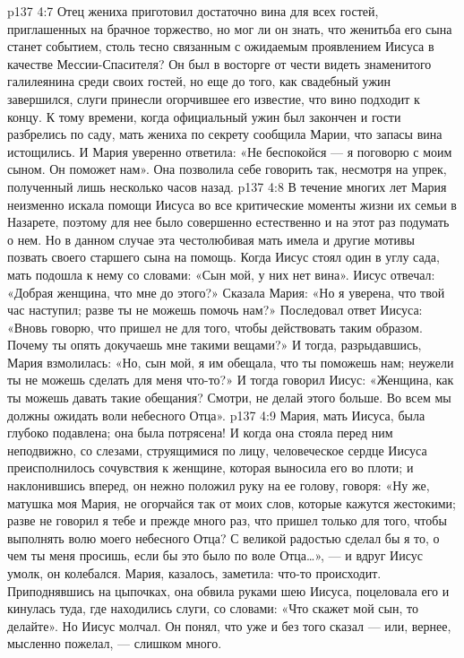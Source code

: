 \vs p137 4:7 \pc Отец жениха приготовил достаточно вина для всех гостей, приглашенных на брачное торжество, но мог ли он знать, что женитьба его сына станет событием, столь тесно связанным с ожидаемым проявлением Иисуса в качестве Мессии\hyp{}Спасителя? Он был в восторге от чести видеть знаменитого галилеянина среди своих гостей, но еще до того, как свадебный ужин завершился, слуги принесли огорчившее его известие, что вино подходит к концу. К тому времени, когда официальный ужин был закончен и гости разбрелись по саду, мать жениха по секрету сообщила Марии, что запасы вина истощились. И Мария уверенно ответила: «Не беспокойся --- я поговорю с моим сыном. Он поможет нам». Она позволила себе говорить так, несмотря на упрек, полученный лишь несколько часов назад.
\vs p137 4:8 В течение многих лет Мария неизменно искала помощи Иисуса во все критические моменты жизни их семьи в Назарете, поэтому для нее было совершенно естественно и на этот раз подумать о нем. Но в данном случае эта честолюбивая мать имела и другие мотивы позвать своего старшего сына на помощь. Когда Иисус стоял один в углу сада, мать подошла к нему со словами: «Сын мой, у них нет вина». Иисус отвечал: «Добрая женщина, что мне до этого?» Сказала Мария: «Но я уверена, что твой час наступил; разве ты не можешь помочь нам?» Последовал ответ Иисуса: «Вновь говорю, что пришел не для того, чтобы действовать таким образом. Почему ты опять докучаешь мне такими вещами?» И тогда, разрыдавшись, Мария взмолилась: «Но, сын мой, я им обещала, что ты поможешь нам; неужели ты не можешь сделать для меня что\hyp{}то?» И тогда говорил Иисус: «Женщина, как ты можешь давать такие обещания? Смотри, не делай этого больше. Во всем мы должны ожидать воли небесного Отца».
\vs p137 4:9 Мария, мать Иисуса, была глубоко подавлена; она была потрясена! И когда она стояла перед ним неподвижно, со слезами, струящимися по лицу, человеческое сердце Иисуса преисполнилось сочувствия к женщине, которая выносила его во плоти; и наклонившись вперед, он нежно положил руку на ее голову, говоря: «Ну же, матушка моя Мария, не огорчайся так от моих слов, которые кажутся жестокими; разве не говорил я тебе и прежде много раз, что пришел только для того, чтобы выполнять волю моего небесного Отца? С великой радостью сделал бы я то, о чем ты меня просишь, если бы это было по воле Отца\ldots », --- и вдруг Иисус умолк, он колебался. Мария, казалось, заметила: что\hyp{}то происходит. Приподнявшись на цыпочках, она обвила руками шею Иисуса, поцеловала его и кинулась туда, где находились слуги, со словами: «Что скажет мой сын, то делайте». Но Иисус молчал. Он понял, что уже и без того сказал --- или, вернее, мысленно пожелал, --- слишком много.
